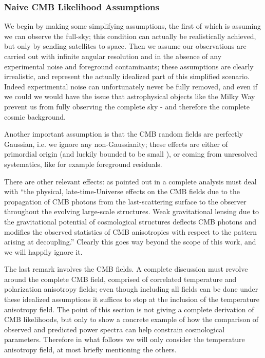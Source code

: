 \subsubsection{Naive CMB Likelihood Assumptions}
We begin by making some simplifying assumptions, the first of which is assuming we can observe the full-sky; this condition can actually be realistically achieved, but only by sending satellites to space. Then we assume our observations are carried out with infinite angular resolution and in the absence of any experimental noise and foreground contaminants; these assumptions are clearly irrealistic, and represent the actually idealized part of this simplified scenario. Indeed experimental noise can unfortunately never be fully removed, and even if we could we would have the issue that astrophysical objects like the Milky Way prevent us from fully observing the complete sky - and therefore the complete cosmic background.

Another important assumption is that the CMB random fields are perfectly Gaussian, i.e. we ignore any non-Gaussianity; these effects are either of primordial origin (and luckily bounded to be small \cite{likelihood_cmb}), or coming from unresolved systematics, like for example foreground residuals.

There are other relevant effects: as pointed out in \cite{likelihood_cmb} a complete analysis must deal with ``the physical, late-time-Universe effects on the CMB fields due to the propagation of CMB photons from the last-scattering surface to the observer throughout the evolving large-scale structures. Weak gravitational lensing due to the gravitational potential of cosmological structures deflects CMB photons and modifies the observed statistics of CMB anisotropies with respect to the pattern arising at decoupling.'' Clearly this goes way beyond the scope of this work, and we will happily ignore it.

The last remark involves the CMB fields. A complete discussion must revolve around the complete CMB field, comprised of correlated temperature and polarization anisotropy fields; even though including all fields can be done under these idealized assumptions it suffices to stop at the inclusion of the temperature anisotropy field. The point of this section is not giving a complete derivation of CMB likelihoods, but only to show a concrete example of how the comparison of observed and predicted power spectra can help constrain cosmological parameters. Therefore in what follows we will only consider the temperature anisotropy field, at most briefly mentioning the others.

